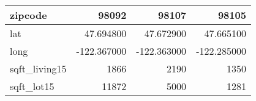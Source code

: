 \begin{table}[H]
\begin{tabular}{|l|r|r|r|}
\hline zipcode & \cellcolor[rgb]{0.9, 0.54, 0.52} 98092 & 98107 & 98105 \\
\hline lat & \cellcolor[rgb]{0.9, 0.54, 0.52} 47.694800 & 47.672900 & 47.665100 \\
\hline long & \cellcolor[rgb]{0.9, 0.54, 0.52} -122.367000 & \cellcolor[rgb]{0.9, 0.54, 0.52} -122.363000 & \cellcolor[rgb]{0.9, 0.54, 0.52} -122.285000 \\
\hline sqft\_living15 & \cellcolor[rgb]{0.9, 0.54, 0.52} 1866 & 2190 & 1350 \\
\hline sqft\_lot15 & \cellcolor[rgb]{0.9, 0.54, 0.52} 11872 & 5000 & 1281 \\
\hline
\end{tabular}
\end{table}

